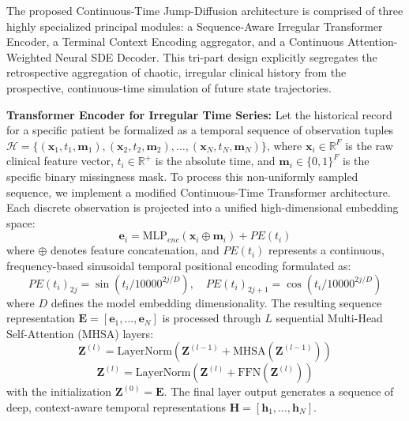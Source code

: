 The proposed Continuous-Time Jump-Diffusion architecture is comprised of three highly specialized principal modules: a Sequence-Aware Irregular Transformer Encoder, a Terminal Context Encoding aggregator, and a Continuous Attention-Weighted Neural SDE Decoder. This tri-part design explicitly segregates the retrospective aggregation of chaotic, irregular clinical history from the prospective, continuous-time simulation of future state trajectories.

\textbf{Transformer Encoder for Irregular Time Series:} Let the historical record for a specific patient be formalized as a temporal sequence of observation tuples $\mathcal{H} = \{(\mathbf{x}_1, t_1, \mathbf{m}_1), (\mathbf{x}_2, t_2, \mathbf{m}_2), \dots, (\mathbf{x}_N, t_N, \mathbf{m}_N)\}$, where $\mathbf{x}_i \in \mathbb{R}^F$ is the raw clinical feature vector, $t_i \in \mathbb{R}^+$ is the absolute time, and $\mathbf{m}_i \in \{0, 1\}^F$ is the specific binary missingness mask. To process this non-uniformly sampled sequence, we implement a modified Continuous-Time Transformer architecture.
Each discrete observation is projected into a unified high-dimensional embedding space:
\begin{equation}
\mathbf{e}_i = \text{MLP}_{enc}(\mathbf{x}_i \oplus \mathbf{m}_i) + PE(t_i)
\end{equation}
where $\oplus$ denotes feature concatenation, and $PE(t_i)$ represents a continuous, frequency-based sinusoidal temporal positional encoding formulated as:
\begin{equation}
PE(t_i)_{2j} = \sin(t_i / 10000^{2j/D}), \quad PE(t_i)_{2j+1} = \cos(t_i / 10000^{2j/D})
\end{equation}
where $D$ defines the model embedding dimensionality. The resulting sequence representation $\mathbf{E} = [\mathbf{e}_1, \dots, \mathbf{e}_N]$ is processed through $L$ sequential Multi-Head Self-Attention (MHSA) layers:
\begin{equation}
\mathbf{Z}^{(l)} = \text{LayerNorm}(\mathbf{Z}^{(l-1)} + \text{MHSA}(\mathbf{Z}^{(l-1)}))
\end{equation}
\begin{equation}
\mathbf{Z}^{(l)} = \text{LayerNorm}(\mathbf{Z}^{(l)} + \text{FFN}(\mathbf{Z}^{(l)}))
\end{equation}
with the initialization $\mathbf{Z}^{(0)} = \mathbf{E}$. The final layer output generates a sequence of deep, context-aware temporal representations $\mathbf{H} = [\mathbf{h}_1, \dots, \mathbf{h}_N]$.

